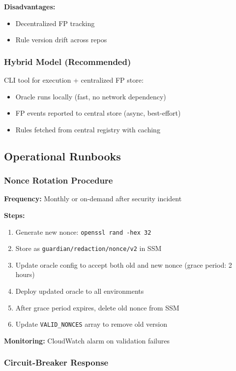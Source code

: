 \documentclass[11pt,a4paper]{article}
\begin{document}
\textbf{Disadvantages:}
\begin{itemize}
\item Decentralized FP tracking
\item Rule version drift across repos
\end{itemize}

\subsubsection{Hybrid Model (Recommended)}

CLI tool for execution + centralized FP store:

\begin{itemize}
\item Oracle runs locally (fast, no network dependency)
\item FP events reported to central store (async, best-effort)
\item Rules fetched from central registry with caching
\end{itemize}

\subsection{Operational Runbooks}

\subsubsection{Nonce Rotation Procedure}

\textbf{Frequency:} Monthly or on-demand after security incident

\textbf{Steps:}
\begin{enumerate}
\item Generate new nonce: \texttt{openssl rand -hex 32}
\item Store as \texttt{guardian/redaction/nonce/v2} in SSM
\item Update oracle config to accept both old and new nonce (grace period: 2 hours)
\item Deploy updated oracle to all environments
\item After grace period expires, delete old nonce from SSM
\item Update \texttt{VALID\_NONCES} array to remove old version
\end{enumerate}

\textbf{Monitoring:} CloudWatch alarm on validation failures

\subsubsection{Circuit-Breaker Response}
\end{document}
